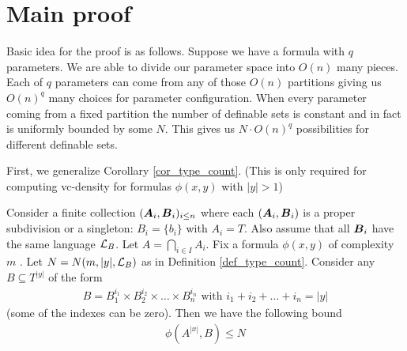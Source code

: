 \documentclass{amsart}
\DeclareMathOperator{\A}{\boldface A}
\DeclareMathOperator{\B}{\boldface B}
\begin{document}
\section{Main proof}

Basic idea for the proof is as follows. Suppose we have a formula with $q$ parameters. We are able to divide our parameter space into $O(n)$ many pieces. Each of $q$ parameters can come from any of those $O(n)$ partitions giving us $O(n)^q$ many choices for parameter configuration. When every parameter coming from a fixed partition the number of definable sets is constant and in fact is uniformly bounded by some $N$. This gives us $N \cdot O(n)^q$ possibilities for different definable sets.

First, we generalize Corollary \ref{cor_type_count}. (This is only required for computing vc-density for formulas $\phi(x, y)$ with $|y| > 1$)

\begin{Lemma} \label{lm_partition_bound}
	Consider a finite collection $(\A_i, \B_i)_{i \leq n}$ where each $(\A_i, \B_i)$ is a proper subdivision or a singleton: $B_i = \{b_i\}$ with $A_i = T$. Also assume that all $\B_i$ have the same language $\mathcal L_B$. Let $A = \bigcap_{i \in I} A_i$. Fix a formula $\phi(x, y)$ of complexity $m$ . Let $N = N(m, |y|, \mathcal L_B)$ as in Definition \ref{def_type_count}. Consider any $B \subseteq T^{|y|}$ of the form
	\begin{align*}
		B = B_1^{i_1} \times B_2^{i_2} \times \ldots \times B_n^{i_n} \text { with } i_1 + i_2 + \ldots + i_n = |y|
	\end{align*}
	(some of the indexes can be zero). Then we have the following bound
	\begin{align*}
		\phi(A^{|x|}, B) \leq N
	\end{align*}
\end{Lemma}
\end{document}
